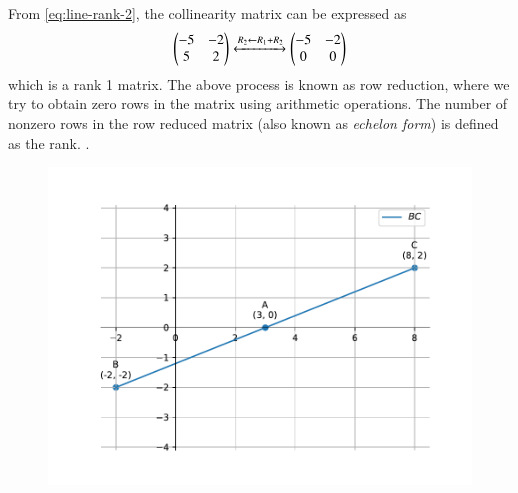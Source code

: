			From \eqref{eq:line-rank-2},
the collinearity matrix can be expressed as
 \begin{align}
			    \begin{pmatrix}-5 & -2
			    \\
			    5 & 2 \end{pmatrix}  
			    \xleftrightarrow[]{R_2 \leftarrow {R_1 + R_2}}
			    \begin{pmatrix}	    -5 & -2  
			    \\
			    0 & 0\end{pmatrix}  
\end{align}
which is a rank 1 matrix. The above process is known as row reduction, where we try to obtain zero rows in the matrix using arithmetic operations.  The number of nonzero rows in the row reduced matrix (also known as {\em echelon form})
is defined as the rank.
		.
	\begin{figure}[H]
		\centering
 \includegraphics[width=0.75\columnwidth]{chapters/11/10/2/20/figs/fig.pdf}
		\caption{}
		\label{fig:11/10/2/20}
  	\end{figure}
